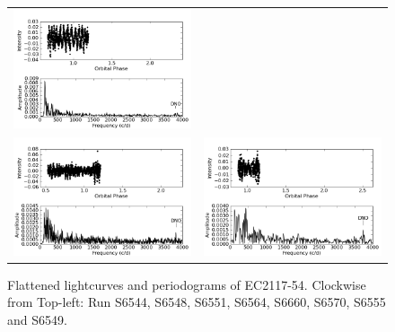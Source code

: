 \begin{figure}
\begin{narrow}{-0.25in}{1.5in}
\begin{tabular}{lr}
\includegraphics[width = 0.50\columnwidth, bb=0 0 600 400]{images/archive_phot/norm_int_eclipsing/S6564d_FF.png} \\
\includegraphics[width = 0.50\columnwidth, bb=0 0 600 400]{images/archive_phot/norm_int_eclipsing/S6570d_FF.png} &
\includegraphics[width = 0.50\columnwidth, bb=0 0 600 400]{images/archive_phot/norm_int_eclipsing/S6660d_FF.png}

\end{tabular}
\end{narrow}
\caption[Flattened lightcurves and periodograms of EC2117-54.]{Flattened lightcurves and periodograms 
of EC2117-54. Clockwise from Top-left: Run S6544, S6548, S6551, S6564, S6660, S6570, S6555 and S6549.} 
\label{ec2117_archive}
\end{figure}


